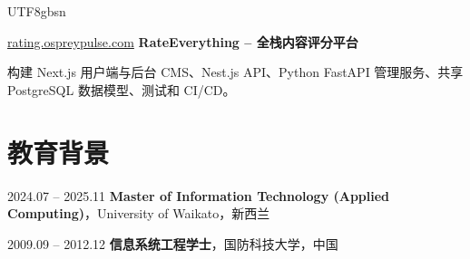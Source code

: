 \documentclass[10pt, letterpaper]{article}
\begin{document}
\begin{CJK*}{UTF8}{gbsn}
        \vspace{0.15 cm}
        \begin{twocolentry}{\href{https://rating.ospreypulse.com}{rating.ospreypulse.com}}
            \textbf{RateEverything -- 全栈内容评分平台}
        \end{twocolentry}
        \begin{onecolentry}
            \begin{highlights}
                \item 构建 Next.js 用户端与后台 CMS、Nest.js API、Python FastAPI 管理服务、共享 PostgreSQL 数据模型、测试和 CI/CD。
            \end{highlights}
        \end{onecolentry}

    \section{教育背景}
        \begin{twocolentry}{2024.07 -- 2025.11}
            \textbf{Master of Information Technology (Applied Computing)}，University of Waikato，新西兰
        \end{twocolentry}
        \vspace{0.10 cm}
        \begin{twocolentry}{2009.09 -- 2012.12}
            \textbf{信息系统工程学士}，国防科技大学，中国
        \end{twocolentry}

\end{CJK*}
\end{document}
